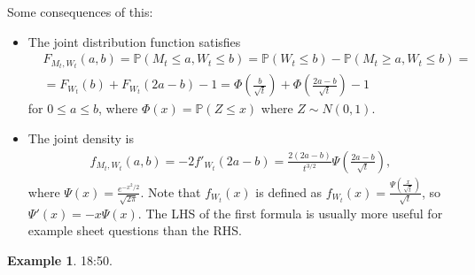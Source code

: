 \documentclass{article}
\theoremstyle{definition}
\newtheorem{example}{Example}[section]
\begin{document}
Some consequences of this:
\begin{itemize}
    \item The joint distribution function satisfies
    \begin{align*}
        &F_{M_t,W_t}(a,b)=\mathbb{P}(M_t\le a,W_t\le b) = \mathbb{P}(W_t\le b) - \mathbb{P}(M_t\ge a, W_t\le b) = \\
        &= F_{W_t}(b) + F_{W_t}(2a-b) - 1 = \Phi \left(\frac{b}{\sqrt{t}}\right) + \Phi \left(\frac{2a-b}{\sqrt{t}}\right)-1
    \end{align*}
    for $0\le a\le b$, where $\Phi(x) = \mathbb{P}(Z\le x)$ where $Z\sim N(0,1)$.
    \item The joint density is 
    \begin{align*}
        f_{M_t,W_t}(a,b) = -2 f'_{W_t}(2a-b) = \frac{2(2a-b)}{t^{3/2}} \Psi\left(\frac{2a-b}{\sqrt{t}}\right),
    \end{align*}
    where $\Psi(x) = \frac{e^{-x^2/2}}{\sqrt{2\pi}}$. Note that $f_{W_t}(x)$ is defined as $f_{W_t}(x) = \frac{\Psi(\frac{x}{\sqrt{t}})}{\sqrt{t}}$, so $\Psi'(x)=-x\Psi(x)$. The LHS of the first formula is usually more useful for example sheet questions than the RHS.
\end{itemize}
\begin{example}
    18:50.
\end{example}
\end{document}

